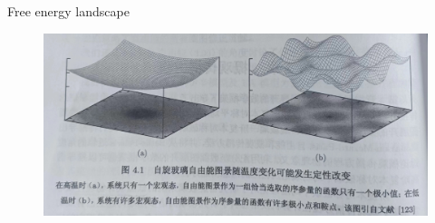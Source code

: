 \documentclass[UTF8]{beamer}
\begin{document}
\begin{frame}{Free energy landscape}
  \begin{figure}
    \centering
    \includegraphics[width=0.9\linewidth]{./fig/FreeEnergy_Landscape.jpg}
  \end{figure}
\end{frame}
\end{document}
